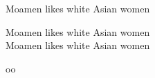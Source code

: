 \documentclass{article}
\begin{document}
\raggedleft
Moamen likes white Asian women \\
\raggedright
Moamen likes white Asian women \\

\centering
Moamen likes white Asian women
\begin{center}
oo
\end{center}
\end{document}
